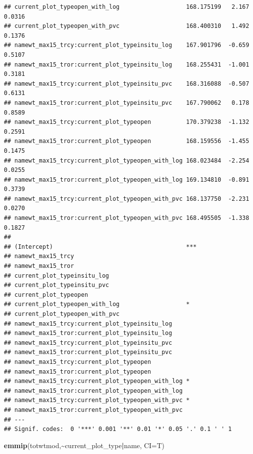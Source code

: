 \documentclass[
]{article}
\newenvironment{Shaded}{\begin{snugshade}}{\end{snugshade}}
\newcommand{\AttributeTok}[1]{\textcolor[rgb]{0.13,0.29,0.53}{#1}}
\newcommand{\FunctionTok}[1]{\textcolor[rgb]{0.13,0.29,0.53}{\textbf{#1}}}
\newcommand{\NormalTok}[1]{#1}
\newcommand{\SpecialCharTok}[1]{\textcolor[rgb]{0.81,0.36,0.00}{\textbf{#1}}}
\begin{document}
\begin{verbatim}
## current_plot_typeopen_with_log                   168.175199   2.167   0.0316
## current_plot_typeopen_with_pvc                   168.400310   1.492   0.1376
## namewt_max15_trcy:current_plot_typeinsitu_log    167.901796  -0.659   0.5107
## namewt_max15_tror:current_plot_typeinsitu_log    168.255431  -1.001   0.3181
## namewt_max15_trcy:current_plot_typeinsitu_pvc    168.316088  -0.507   0.6131
## namewt_max15_tror:current_plot_typeinsitu_pvc    167.790062   0.178   0.8589
## namewt_max15_trcy:current_plot_typeopen          170.379238  -1.132   0.2591
## namewt_max15_tror:current_plot_typeopen          168.159556  -1.455   0.1475
## namewt_max15_trcy:current_plot_typeopen_with_log 168.023484  -2.254   0.0255
## namewt_max15_tror:current_plot_typeopen_with_log 169.134810  -0.891   0.3739
## namewt_max15_trcy:current_plot_typeopen_with_pvc 168.137750  -2.231   0.0270
## namewt_max15_tror:current_plot_typeopen_with_pvc 168.495505  -1.338   0.1827
##                                                     
## (Intercept)                                      ***
## namewt_max15_trcy                                   
## namewt_max15_tror                                   
## current_plot_typeinsitu_log                         
## current_plot_typeinsitu_pvc                         
## current_plot_typeopen                               
## current_plot_typeopen_with_log                   *  
## current_plot_typeopen_with_pvc                      
## namewt_max15_trcy:current_plot_typeinsitu_log       
## namewt_max15_tror:current_plot_typeinsitu_log       
## namewt_max15_trcy:current_plot_typeinsitu_pvc       
## namewt_max15_tror:current_plot_typeinsitu_pvc       
## namewt_max15_trcy:current_plot_typeopen             
## namewt_max15_tror:current_plot_typeopen             
## namewt_max15_trcy:current_plot_typeopen_with_log *  
## namewt_max15_tror:current_plot_typeopen_with_log    
## namewt_max15_trcy:current_plot_typeopen_with_pvc *  
## namewt_max15_tror:current_plot_typeopen_with_pvc    
## ---
## Signif. codes:  0 '***' 0.001 '**' 0.01 '*' 0.05 '.' 0.1 ' ' 1
\end{verbatim}

\begin{Shaded}
\begin{Highlighting}[]
\FunctionTok{emmip}\NormalTok{(totwtmod,}\SpecialCharTok{\textasciitilde{}}\NormalTok{current\_plot\_type}\SpecialCharTok{|}\NormalTok{name, }\AttributeTok{CI=}\NormalTok{T)}
\end{Highlighting}
\end{Shaded}
\end{document}
